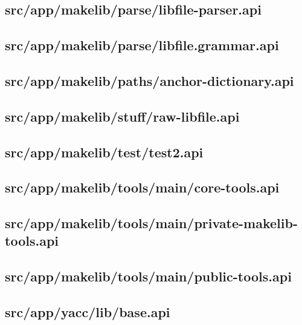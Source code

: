 \subsection{src/app/makelib/parse/libfile-parser.api}


\subsection{src/app/makelib/parse/libfile.grammar.api}


\subsection{src/app/makelib/paths/anchor-dictionary.api}


\subsection{src/app/makelib/stuff/raw-libfile.api}


\subsection{src/app/makelib/test/test2.api}


\subsection{src/app/makelib/tools/main/core-tools.api}


\subsection{src/app/makelib/tools/main/private-makelib-tools.api}


\subsection{src/app/makelib/tools/main/public-tools.api}


\subsection{src/app/yacc/lib/base.api}


